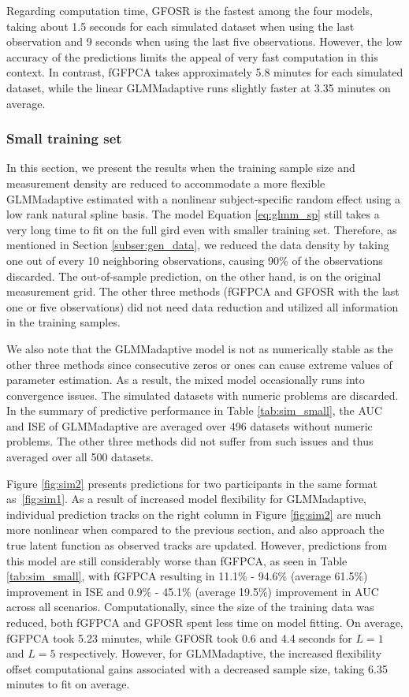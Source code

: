 \documentclass[12pt]{article}
\begin{document}
Regarding computation time, GFOSR is the fastest among the four models, taking about 1.5 seconds for each simulated dataset when using the last observation and 9 seconds when using the last five observations. However, the low accuracy of the predictions limits the appeal of very fast computation in this context. In contrast, fGFPCA takes approximately 5.8 minutes for each simulated dataset, while the linear GLMMadaptive runs slightly faster at 3.35 minutes on average. 


\subsubsection{Small training set}
\label{sssec:sim_result_small}

In this section, we present the results when the training sample size and measurement density are reduced to accommodate a more flexible GLMMadaptive estimated with a nonlinear subject-specific random effect using a low rank natural spline basis. The model Equation \ref{eq:glmm_sp} still takes a very long time to fit on the full gird even with smaller training set. Therefore, as mentioned in Section \ref{subser:gen_data}, we reduced the data density by taking one out of every 10 neighboring observations, causing 90\% of the observations discarded. The out-of-sample prediction, on the other hand, is on the original measurement grid. The other three methods (fGFPCA and GFOSR with the last one or five observations) did not need data reduction and utilized all information in the training samples. 

We also note that the GLMMadaptive model is not as numerically stable as the other three methods since consecutive zeros or ones can cause extreme values of parameter estimation. As a result, the mixed model occasionally runs into convergence issues. The simulated datasets with numeric problems are discarded. In the summary of predictive performance in Table \ref{tab:sim_small}, the AUC and ISE of GLMMadaptive are averaged over 496 datasets without numeric problems. The other three methods did not suffer from such issues and thus averaged over all 500 datasets. 

Figure \ref{fig:sim2} presents predictions for two participants in the same format as~\ref{fig:sim1}. As a result of increased model flexibility for GLMMadaptive, individual prediction tracks on the right column in Figure \ref{fig:sim2} are much more nonlinear when compared to the previous section, and also approach the true latent function as observed tracks are updated. However, predictions from this model are still considerably worse than fGFPCA, as seen in Table \ref{tab:sim_small}, with fGFPCA resulting in 11.1\% - 94.6\% (average 61.5\%) improvement in ISE and 0.9\% - 45.1\% (average 19.5\%) improvement in AUC across all scenarios. Computationally, since the size of the training data was reduced, both fGFPCA and GFOSR spent less time on model fitting. On average, fGFPCA took 5.23 minutes, while GFOSR took 0.6 and 4.4 seconds for $L=1$ and $L=5$  respectively. However, for GLMMadaptive, the increased flexibility offset computational gains associated with a decreased sample size, taking 6.35 minutes to fit on average. 
\end{document}
